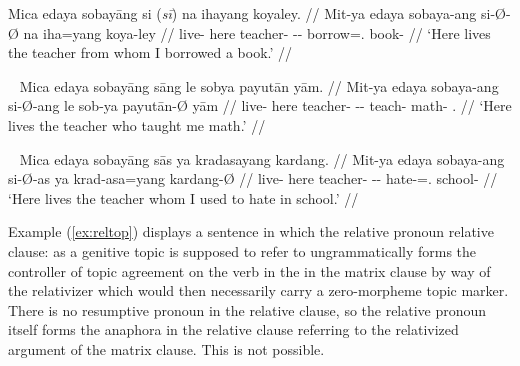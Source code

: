 \pex\label{ex:reltop}
\ljudge* \begingl
	\gla Mica edaya sobayāng {si \textup{(\ques{}\textit{sī})}} na ihayang 
		koyaley. //
	\glb Mit-ya edaya sobaya-ang si-Ø-Ø na iha=yang koya-ley //
	\glc live-\TsgM{} here teacher-\Aarg{} \Rel{}-\Aarg{}-\Top{} \GenT{} 
		borrow=\Fsg{}.\Aarg{} book-\PargI{} //
% 
	\glft `Here lives the teacher from whom I borrowed a book.' //
\endgl
\xe

\pex~\label{ex:relagt}
\ljudge* \begingl
	\gla Mica edaya sobayāng sāng le sobya payutān yām. //
	\glb Mit-ya edaya sobaya-ang si-Ø-ang le sob-ya payutān-Ø yām //
	\glc live-\TsgM{} here teacher-\Aarg{} \Rel{}-\Aarg{}-\Aarg{} \PatTI{} 
		teach-\TsgM{} math-\Top{} \Fsg{}.\Dat{} //
% 
	\glft `Here lives the teacher who taught me math.' //
\endgl
\xe

\pex~\label{ex:relpat}
\ljudge* \begingl
	\gla Mica edaya sobayāng sās ya kradasayang kardang. //
	\glb Mit-ya edaya sobaya-ang si-Ø-as ya krad-asa=yang kardang-Ø //
	\glc live-\TsgM{} here teacher-\Aarg{} \Rel{}-\Aarg{}-\Parg{} \LocT{}
		hate-\Hab{}=\Fsg{}.\Aarg{} school-\Top{} //
% 
	\glft `Here lives the teacher whom I used to hate in school.' //
\endgl
\xe

Example (\ref{ex:reltop}) displays a sentence in which the relative pronoun 
relative clause:  as a genitive topic is supposed to refer to 
ungrammatically forms the controller of topic agreement on the verb in the 
 in the matrix clause by way of the relativizer 
 which would then necessarily carry a zero-morpheme topic 
marker. There is no resumptive pronoun in the relative clause, so the relative 
pronoun itself forms the anaphora in the relative clause referring to the 
relativized argument of the matrix clause. This is not possible.

